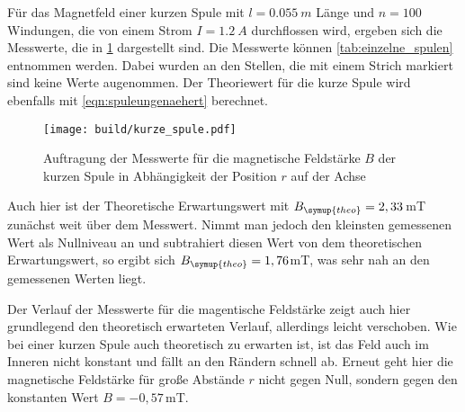 Für das Magnetfeld einer kurzen Spule mit $l=\SI{0,055}{m}$ Länge und $n=100$ Windungen,
die von einem Strom $I=\SI{1,2}{A}$ durchflossen wird, ergeben sich die Messwerte, die in
\ref{fig:kurze_spule} dargestellt sind. Die Messwerte können \ref{tab:einzelne_spulen}
entnommen werden. Dabei wurden an den Stellen, die mit einem Strich markiert sind keine
Werte augenommen.
Der Theoriewert für die kurze Spule wird ebenfalls mit \ref{eqn:spuleungenaehert} berechnet.

\begin{figure}
  \centering
  \texttt{[image: build/kurze\_spule.pdf]}
  \caption{Auftragung der Messwerte für die magnetische Feldstärke $B$ der kurzen Spule
  in Abhängigkeit der Position $r$ auf der Achse}
  \label{fig:kurze_spule}
\end{figure}


Auch hier ist der Theoretische Erwartungswert mit $B_{\symup{theo}}=2,33$\,mT zunächst
weit über dem Messwert. Nimmt man jedoch den kleinsten gemessenen Wert als Nullniveau
an und subtrahiert diesen Wert von dem theoretischen Erwartungswert, so ergibt sich
$B_{\symup{theo}}=1,76$mT, was sehr nah an den gemessenen Werten liegt.

Der Verlauf der Messwerte für die magentische Feldstärke zeigt auch hier grundlegend
den theoretisch erwarteten Verlauf, allerdings leicht verschoben. Wie bei einer kurzen Spule auch theoretisch
zu erwarten ist, ist das Feld auch im Inneren nicht konstant und fällt an den Rändern
schnell ab. Erneut geht hier die magnetische Feldstärke für große Abstände $r$ nicht
gegen Null, sondern gegen den konstanten Wert $B=-0,57$\,mT.


